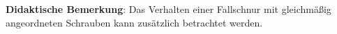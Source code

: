 \documentclass[../main.tex]{subfiles}
\begin{document}
\begin{tcolorbox}
\begin{minipage}[]{0.2\textwidth}
    \end{minipage}

    \vspace{-0.5cm}
    \textbf{Didaktische Bemerkung}: Das Verhalten einer Fallschnur mit gleichmäßig angeordneten Schrauben kann zusätzlich betrachtet werden. 

\end{tcolorbox}
\end{document}
